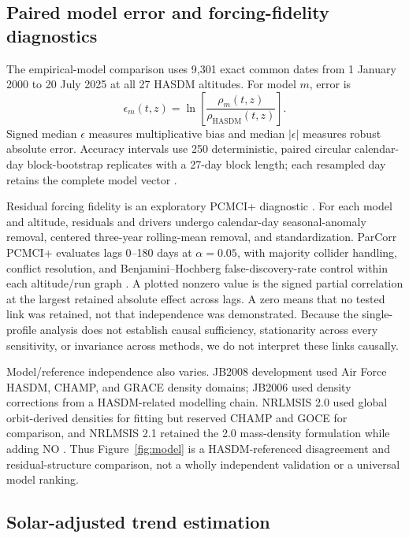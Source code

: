 \documentclass[11pt]{article}
\begin{document}
\subsection{Paired model error and forcing-fidelity diagnostics}

The empirical-model comparison uses 9,301 exact common dates from 1 January
2000 to 20 July 2025 at all 27 HASDM altitudes.  For model $m$, error is
\begin{equation}
  \epsilon_m(t,z)=\ln\!\left[\frac{\rho_m(t,z)}{\rho_{\mathrm{HASDM}}(t,z)}\right].
\end{equation}
Signed median $\epsilon$ measures multiplicative bias and median
$|\epsilon|$ measures robust absolute error.  Accuracy intervals use 250
deterministic, paired circular calendar-day block-bootstrap replicates with a
27-day block length; each resampled day retains the complete model vector
\citep{kunsch1989}.

Residual forcing fidelity is an exploratory PCMCI+ diagnostic
\citep{runge2020}.  For each model and altitude, residuals and drivers undergo
calendar-day seasonal-anomaly removal, centered three-year rolling-mean
removal, and standardization.  ParCorr PCMCI+ evaluates lags 0--180 days at
$\alpha=0.05$, with majority collider handling, conflict resolution, and
Benjamini--Hochberg false-discovery-rate control within each altitude/run graph
\citep{benjamini1995}.  A plotted nonzero value is the signed partial
correlation at the largest retained absolute effect across lags.  A zero means
that no tested link was retained, not that independence was demonstrated.
Because the single-profile analysis does not establish causal sufficiency,
stationarity across every sensitivity, or invariance across methods, we do not
interpret these links causally.

Model/reference independence also varies.  JB2008 development used Air Force
HASDM, CHAMP, and GRACE density domains; JB2006 used density corrections from a
HASDM-related modelling chain.  NRLMSIS 2.0 used global orbit-derived densities
for fitting but reserved CHAMP and GOCE for comparison, and NRLMSIS 2.1 retained
the 2.0 mass-density formulation while adding NO \citep{emmert2021,emmert2022,
bowman2008jb2006,bowman2008jb2008}.  Thus Figure~\ref{fig:model} is a
HASDM-referenced disagreement and residual-structure comparison, not a wholly
independent validation or a universal model ranking.

\subsection{Solar-adjusted trend estimation}
\end{document}
